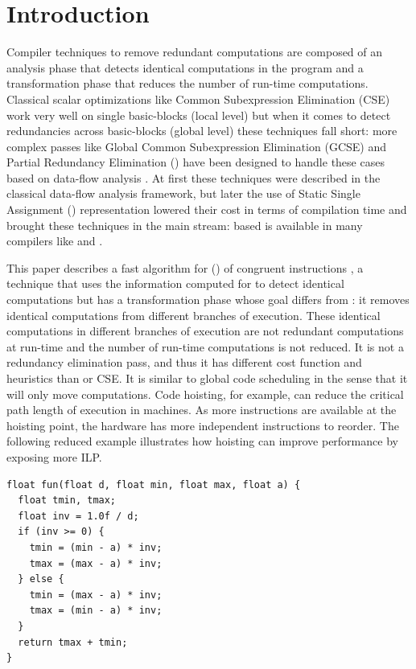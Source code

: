 \documentclass[sigplan,10pt,review,anonymous]{acmart}\settopmatter{printfolios=true,printccs=false,printacmref=false}
\begin{document}
\section{Introduction}
\label{sec:intro}
Compiler techniques to remove redundant computations are composed of an analysis
phase that detects identical computations in the program and a transformation
phase that reduces the number of run-time computations.  Classical scalar
optimizations like Common Subexpression Elimination (CSE) \cite{dragonbook} work
very well on single basic-blocks (local level) but when it comes to detect
redundancies across basic-blocks (global level) these techniques fall short:
more complex passes like Global Common Subexpression Elimination (GCSE) and
Partial Redundancy Elimination (\PRE{}) have been designed to handle these cases
based on data-flow analysis \cite{morel1979global}.  At first these techniques
were described in the classical data-flow analysis framework, but later the use
of Static Single Assignment (\SSA{}) representation lowered their cost in terms
of compilation time \cite{briggs1994effective,chow1997new,kennedy1999partial}
and brought these techniques in the main stream: \SSA{} based \PRE{} is
available in many compilers like \GCC{} and \LLVM{}.

This paper describes a fast algorithm for \gcm{} (\GCM{}) of congruent
instructions \cite{briggs1997}, a technique that uses the information computed
for \PRE{} to detect identical computations but has a transformation phase whose
goal differs from \PRE{}: it removes identical computations from different
branches of execution.  These identical computations in different branches of
execution are not redundant computations at run-time and the number of run-time
computations is not reduced. It is not a redundancy elimination pass, and thus
it has different cost function and heuristics than \PRE{} or CSE. It is similar
to global code scheduling \cite{dragonbook,click1995global} in the sense that it
will only move computations. Code hoisting, for example, can reduce the critical
path length of execution in \ooo{} machines. As more instructions are available
at the hoisting point, the hardware has more independent instructions to
reorder. The following reduced example illustrates how hoisting can improve
performance by exposing more ILP.

\begin{lstlisting}
float fun(float d, float min, float max, float a) {
  float tmin, tmax;
  float inv = 1.0f / d;
  if (inv >= 0) {
    tmin = (min - a) * inv;
    tmax = (max - a) * inv;
  } else {
    tmin = (max - a) * inv;
    tmax = (min - a) * inv;
  }
  return tmax + tmin;
}
\end{lstlisting}
\end{document}

